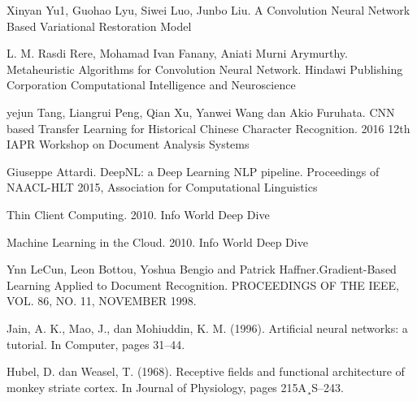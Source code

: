 \begin{thebibliography}{4}
 Xinyan Yu1, Guohao Lyu, Siwei Luo, Junbo Liu. A Convolution Neural Network Based Variational Restoration Model

 L. M. Rasdi Rere, Mohamad Ivan Fanany, Aniati Murni Arymurthy. Metaheuristic Algorithms for Convolution Neural Network. Hindawi Publishing Corporation Computational Intelligence and Neuroscience

 yejun Tang, Liangrui Peng, Qian Xu, Yanwei Wang dan Akio Furuhata. CNN based Transfer Learning for Historical Chinese Character Recognition. 2016 12th IAPR Workshop on Document Analysis Systems

 Giuseppe Attardi. DeepNL: a Deep Learning NLP pipeline. Proceedings of NAACL-HLT 2015, Association for Computational Linguistics

 Thin Client Computing. 2010. Info World Deep Dive

 Machine Learning in the Cloud. 2010. Info World Deep Dive

Ynn LeCun, Leon Bottou, Yoshua Bengio and Patrick Haffner.Gradient-Based Learning Applied to Document Recognition. PROCEEDINGS OF THE IEEE, VOL. 86, NO. 11, NOVEMBER 1998.

Jain, A. K., Mao, J., dan Mohiuddin, K. M. (1996). Artificial neural networks: a
tutorial. In Computer, pages 31–44.

Hubel, D. dan Weasel, T. (1968). Receptive fields and functional architecture of
monkey striate cortex. In Journal of Physiology, pages 215A¸S–243.

\end{thebibliography}


